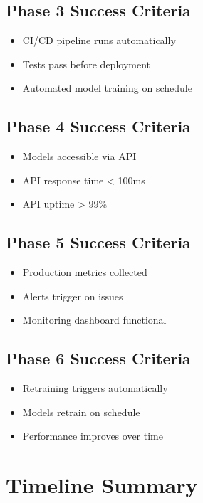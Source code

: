 \documentclass[12pt]{article}
\begin{document}
\subsection{Phase 3 Success Criteria}
\begin{itemize}
    \item CI/CD pipeline runs automatically
    \item Tests pass before deployment
    \item Automated model training on schedule
\end{itemize}

\subsection{Phase 4 Success Criteria}
\begin{itemize}
    \item Models accessible via API
    \item API response time < 100ms
    \item API uptime > 99\%
\end{itemize}

\subsection{Phase 5 Success Criteria}
\begin{itemize}
    \item Production metrics collected
    \item Alerts trigger on issues
    \item Monitoring dashboard functional
\end{itemize}

\subsection{Phase 6 Success Criteria}
\begin{itemize}
    \item Retraining triggers automatically
    \item Models retrain on schedule
    \item Performance improves over time
\end{itemize}

\section{Timeline Summary}
\end{document}
